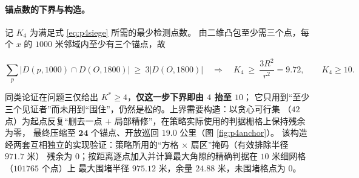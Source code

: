 \documentclass[withoutpreface, bwprint]{cumcmthesis}
\begin{document}
\paragraph{锚点数的下界与构造。}
记 $K_4$ 为满足式 \eqref{eq:p4siege} 所需的最少检测点数。
由二维凸包至少需三个点，每个 $x$ 的 $1000$ 米邻域内至少有三个锚点，故

\begin{equation}
  \label{eq:p4lb}
  \sum_{p}\bigl\lvert D(p,1000)\cap D(O,1800)\bigr\rvert\ \ge\ 3\bigl\lvert D(O,1800)\bigr\rvert
  \quad\Longrightarrow\quad
  K_4\ \ge\ \frac{3R^2}{r^2}=9.72,\qquad K_4\ge 10 .
\end{equation}

同类论证在问题三仅给出 $K^{*}\ge 4$，\textbf{仅这一步下界即由 $4$ 抬至 $10$}；
它只用到“至少三个见证者”而未用到“围住”，仍然是松的。上界需要构造：以贪心可行集
（$42$ 点）为起点反复“删去一点 $+$ 局部精修”，在策略实际使用的判据栅格上保持残余为零，
最终压缩至 $\mathbf{24}$ 个锚点、开放巡回 $19.0$ 公里（图 \ref{fig:p4anchor}）。
该构造经两套互相独立的实现验证：策略所用的“方格 $\times$ 扇区”掩码（有效排除半径 $971.7$ 米）
残余为 $0$；按距离逐点加入并计算最大角隙的精确判据在 $10$ 米细网格（$101765$ 个点）上
最大围堵半径 $975.12$ 米，余量 $24.88$ 米，未围堵格点为 $0$。
\end{document}

